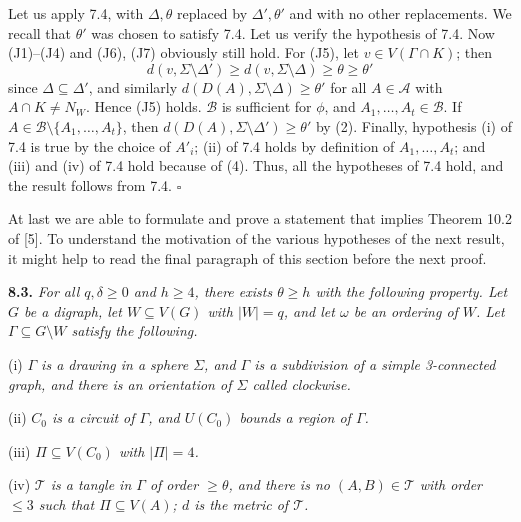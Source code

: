 Let us apply 7.4, with $\Delta, \theta$ replaced by $\Delta', \theta'$ and with no other replacements. We recall that $\theta'$ was chosen to satisfy 7.4. Let us verify the hypothesis of 7.4. Now (J1)--(J4) and (J6), (J7) obviously still hold. For (J5), let $v \in V(\Gamma \cap K)$; then
\begin{equation*}
d(v, \Sigma \setminus \Delta') \ge d(v, \Sigma \setminus \Delta) \ge \theta \ge \theta'
\end{equation*}
since $\Delta \subseteq \Delta'$, and similarly $d(D(A), \Sigma \setminus \Delta) \ge \theta'$ for all $A \in \mathcal{A}$ with $A \cap K \ne N_W$. Hence (J5) holds. $\mathcal{B}$ is sufficient for $\phi$, and $A_1, \dots, A_t \in \mathcal{B}$. If $A \in \mathcal{B} \setminus \{A_1, \dots, A_t\}$, then $d(D(A), \Sigma \setminus \Delta') \ge \theta'$ by (2). Finally, hypothesis (i) of 7.4 is true by the choice of $A'_i$; (ii) of 7.4 holds by definition of $A_1, \dots, A_t$; and (iii) and (iv) of 7.4 hold because of (4). Thus, all the hypotheses of 7.4 hold, and the result follows from 7.4. $\square$

At last we are able to formulate and prove a statement that implies Theorem 10.2 of [5]. To understand the motivation of the various hypotheses of the next result, it might help to read the final paragraph of this section before the next proof.

\textbf{8.3.} \textit{For all $q, \delta \ge 0$ and $h \ge 4$, there exists $\theta \ge h$ with the following property. Let $G$ be a digraph, let $W \subseteq V(G)$ with $|W| = q$, and let $\omega$ be an ordering of $W$. Let $\Gamma \subseteq G \setminus W$ satisfy the following.}

\hspace*{12pt}(i) \textit{$\Gamma$ is a drawing in a sphere $\Sigma$, and $\Gamma$ is a subdivision of a simple 3-connected graph, and there is an orientation of $\Sigma$ called clockwise.}

\hspace*{12pt}(ii) \textit{$C_0$ is a circuit of $\Gamma$, and $U(C_0)$ bounds a region of $\Gamma$.}

\hspace*{12pt}(iii) \textit{$\Pi \subseteq V(C_0)$ with $|\Pi| = 4$.}

\hspace*{12pt}(iv) \textit{$\mathcal{T}$ is a tangle in $\Gamma$ of order $\ge \theta$, and there is no $(A, B) \in \mathcal{T}$ with order $\le 3$ such that $\Pi \subseteq V(A)$; $d$ is the metric of $\mathcal{T}$.}

